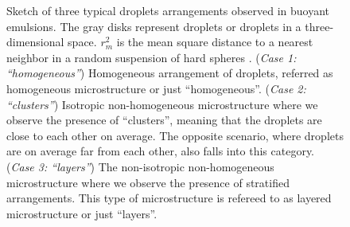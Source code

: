 \begin{figure}[h!]
\begin{tikzpicture}
\end{tikzpicture}
\hfill
\caption{Sketch of three typical droplets arrangements observed in buoyant emulsions.
The gray disks represent droplets or droplets in a three-dimensional space. 
$r_m^2$ is the mean square distance to a nearest neighbor in a random suspension of hard spheres \citep{zhang2023evolution,fintzi2024buoyancy}.  
(\textit{Case 1: ``homogeneous''}) Homogeneous arrangement of droplets, referred as homogeneous microstructure or just ``homogeneous''.
(\textit{Case 2: ``clusters''}) Isotropic non-homogeneous microstructure where we  observe the presence of ``clusters'', meaning that the droplets are close to each other on average.
The opposite scenario, where droplets are on average far from each other, also falls into this category. 
(\textit{Case 3: ``layers''}) The non-isotropic non-homogeneous microstructure where we observe the presence of stratified arrangements.
This type of microstructure is refereed to as layered microstructure or just ``layers''. 
}
\label{fig:scheme_clusters}
\end{figure}
